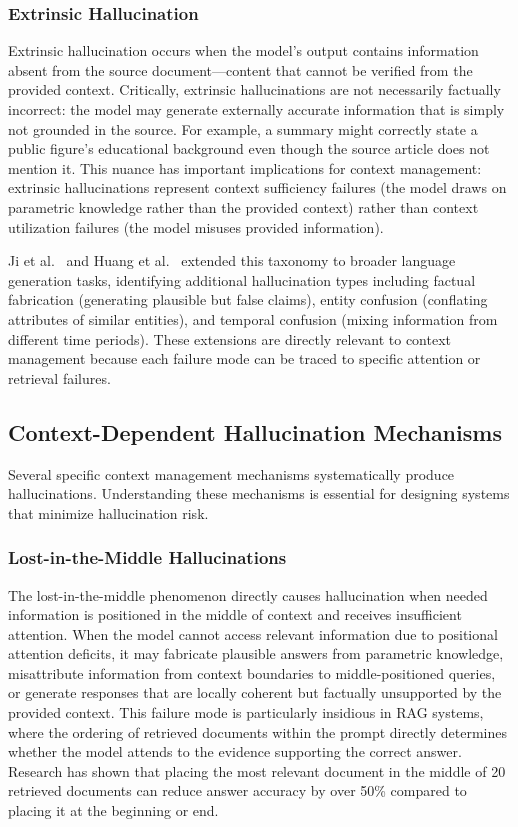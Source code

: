 \documentclass[11pt,letterpaper]{article}
\begin{document}
\subsubsection{Extrinsic Hallucination}

Extrinsic hallucination occurs when the model's output contains information absent from the source document---content that cannot be verified from the provided context. Critically, extrinsic hallucinations are not necessarily factually incorrect: the model may generate externally accurate information that is simply not grounded in the source. For example, a summary might correctly state a public figure's educational background even though the source article does not mention it. This nuance has important implications for context management: extrinsic hallucinations represent context sufficiency failures (the model draws on parametric knowledge rather than the provided context) rather than context utilization failures (the model misuses provided information).

Ji et al.\ \cite{ji2023survey} and Huang et al.\ \cite{huang2023survey} extended this taxonomy to broader language generation tasks, identifying additional hallucination types including factual fabrication (generating plausible but false claims), entity confusion (conflating attributes of similar entities), and temporal confusion (mixing information from different time periods). These extensions are directly relevant to context management because each failure mode can be traced to specific attention or retrieval failures.

\subsection{Context-Dependent Hallucination Mechanisms}

Several specific context management mechanisms systematically produce hallucinations. Understanding these mechanisms is essential for designing systems that minimize hallucination risk.

\subsubsection{Lost-in-the-Middle Hallucinations}

The lost-in-the-middle phenomenon \cite{liu2024lost} directly causes hallucination when needed information is positioned in the middle of context and receives insufficient attention. When the model cannot access relevant information due to positional attention deficits, it may fabricate plausible answers from parametric knowledge, misattribute information from context boundaries to middle-positioned queries, or generate responses that are locally coherent but factually unsupported by the provided context. This failure mode is particularly insidious in RAG systems, where the ordering of retrieved documents within the prompt directly determines whether the model attends to the evidence supporting the correct answer. Research has shown that placing the most relevant document in the middle of 20 retrieved documents can reduce answer accuracy by over 50\% compared to placing it at the beginning or end.
\end{document}
